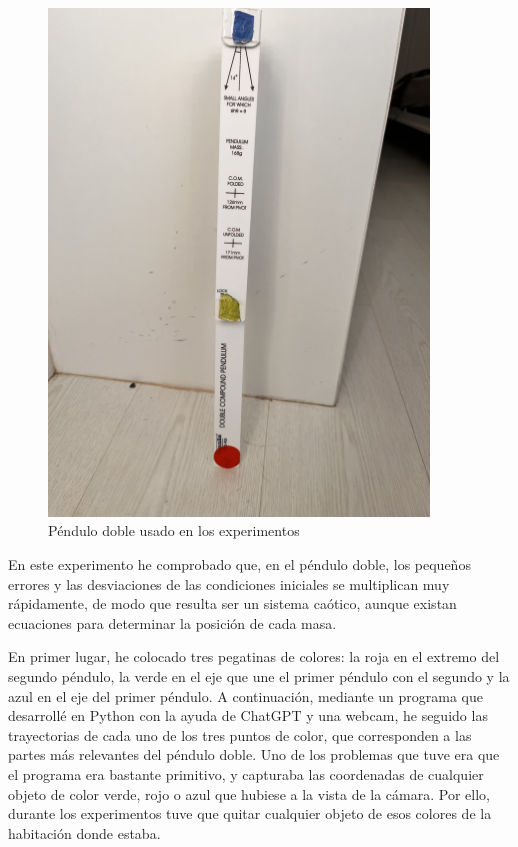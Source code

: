 \documentclass[
  10pt,
  a4paper,
  DIV=11,
  numbers=noendperiod,
  open=any]{scrreprt}
\numberwithin{equation}{chapter}
\numberwithin{equation}{section}
\renewcommand{\[}{\begin{equation}}
\renewcommand{\]}{\end{equation}}
\begin{document}
\begin{figure}[h]
  \centering
  \includegraphics[width=0.9\textwidth]{02-pendulo-doble/doble.jpeg}
  \caption{Péndulo doble usado en los experimentos}
\end{figure}


En este experimento he comprobado que, en el péndulo doble, los pequeños
errores y las desviaciones de las condiciones iniciales se multiplican
muy rápidamente, de modo que resulta ser un sistema caótico, aunque existan ecuaciones para determinar la posición de cada masa. 

En primer lugar, he colocado tres pegatinas de colores: la roja en el extremo del
segundo péndulo, la verde en el eje que une el primer péndulo con el
segundo y la azul en el eje del primer péndulo. A continuación, mediante
un programa que desarrollé en Python con la ayuda de ChatGPT y una
webcam, he seguido las trayectorias de cada uno de los tres puntos de
color, que corresponden a las partes más relevantes del péndulo doble. Uno de los problemas que tuve era que el programa era bastante primitivo, y capturaba las coordenadas de cualquier objeto de color verde, rojo o azul que hubiese a la vista de la cámara. Por ello, durante los experimentos tuve que quitar cualquier objeto de esos colores de la habitación donde estaba. 
\end{document}
